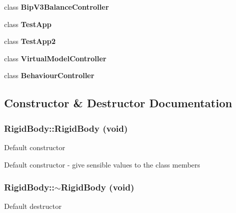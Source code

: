 \begin{DoxyCompactItemize}
\item 
\hypertarget{classCartWheel_1_1Physics_1_1RigidBody_a60c86d71327fa939d5fb8c0b6c232a2b}{
class {\bfseries BipV3BalanceController}}
\label{classCartWheel_1_1Physics_1_1RigidBody_a60c86d71327fa939d5fb8c0b6c232a2b}

\item 
\hypertarget{classCartWheel_1_1Physics_1_1RigidBody_a53f540ec72017006b082b2cb716644c1}{
class {\bfseries TestApp}}
\label{classCartWheel_1_1Physics_1_1RigidBody_a53f540ec72017006b082b2cb716644c1}

\item 
\hypertarget{classCartWheel_1_1Physics_1_1RigidBody_afc60a5a7cb2c98d03f699118d5e75af1}{
class {\bfseries TestApp2}}
\label{classCartWheel_1_1Physics_1_1RigidBody_afc60a5a7cb2c98d03f699118d5e75af1}

\item 
\hypertarget{classCartWheel_1_1Physics_1_1RigidBody_a0b58594678c420e5766977afa192b210}{
class {\bfseries VirtualModelController}}
\label{classCartWheel_1_1Physics_1_1RigidBody_a0b58594678c420e5766977afa192b210}

\item 
\hypertarget{classCartWheel_1_1Physics_1_1RigidBody_a780a8b03a34ab6eb2a7c3944c135ac33}{
class {\bfseries BehaviourController}}
\label{classCartWheel_1_1Physics_1_1RigidBody_a780a8b03a34ab6eb2a7c3944c135ac33}

\end{DoxyCompactItemize}


\subsection{Constructor \& Destructor Documentation}
\hypertarget{classCartWheel_1_1Physics_1_1RigidBody_ab91c3f0c53842a1b9381cd8a13276f0e}{
\subsubsection[{RigidBody}]{\setlength{\rightskip}{0pt plus 5cm}RigidBody::RigidBody (void)}}
\label{classCartWheel_1_1Physics_1_1RigidBody_ab91c3f0c53842a1b9381cd8a13276f0e}
Default constructor

Default constructor -\/ give sensible values to the class members \hypertarget{classCartWheel_1_1Physics_1_1RigidBody_ac352781e5e8c394d35e203197dd2e893}{
\subsubsection[{$\sim$RigidBody}]{\setlength{\rightskip}{0pt plus 5cm}RigidBody::$\sim$RigidBody (void)}}
\label{classCartWheel_1_1Physics_1_1RigidBody_ac352781e5e8c394d35e203197dd2e893}
Default destructor


